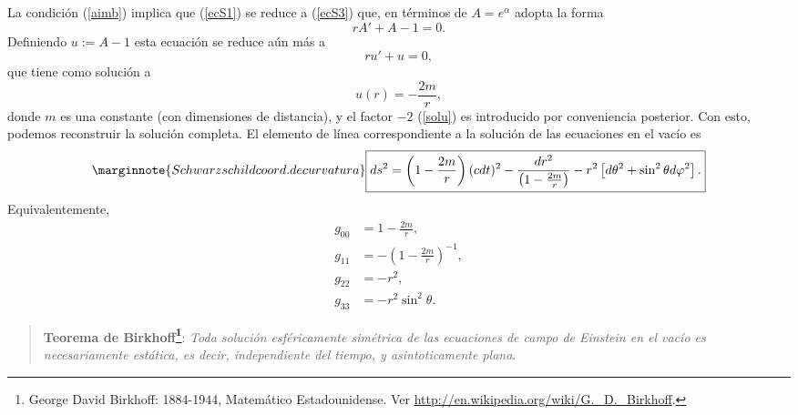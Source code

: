 La condición (\ref{aimb}) implica que (\ref{ecS1}) se reduce a (\ref{ecS3})
que, en términos de $A=e^{\alpha}$ adopta la forma
\begin{equation}
 rA'+A-1=0.
\end{equation}
Definiendo $u:=A-1$ esta ecuación se reduce aún más a
\begin{equation}
 ru'+u=0,
\end{equation}
que tiene como solución a
\begin{equation}
 u(r)=-\frac{2m}{r}, \label{solu}
\end{equation}
donde $m$ es una constante (con dimensiones de distancia), y el factor $-2$
 (\ref{solu}) es introducido por conveniencia posterior. Con esto,
podemos reconstruir la solución completa. El elemento de línea correspondiente
a la solución de las ecuaciones en el vacío es
\begin{equation}\marginnote{Schwarzschild coord. de curvatura}
\boxed{ds^2=\left( 1-\frac{2m}{r}\right) (cdt)^2-\frac{dr^2}{\left( 1-\frac
{2m}{r}\right) }-r^2\left[ d\theta^2+\sin^2\theta d\varphi^2\right].}
\label{Sch}
\end{equation}
Equivalentemente,
\begin{align}
g_{00} & =1-\frac{2m}{r},\\
g_{11} & =-\left( 1-\frac{2m}{r}\right) ^{-1},\\
g_{22} & =-r^2,\\
g_{33} & =-r^2\sin^2\theta.
\end{align}
\begin{quotation}
\textbf{Teorema de Birkhoff\footnote{George David Birkhoff: 1884-1944, Matemático Estadounidense. Ver \url{http://en.wikipedia.org/wiki/G._D._Birkhoff}.}}: \textit{Toda solución esféricamente simétrica de las ecuaciones de campo de Einstein en el vacío es necesariamente estática, es decir, independiente del tiempo, y asintoticamente plana}.
\end{quotation}

